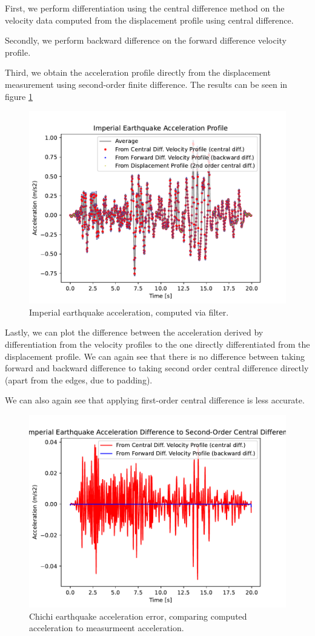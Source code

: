 First, we perform differentiation using the central difference method on the velocity data 
computed from the displacement profile using central difference.

Secondly, we perform backward difference on the forward difference velocity profile.

Third, we obtain the acceleration profile directly from the displacement measurement using second-order 
finite difference. The results can be seen in figure \ref{imperial_acceleration}

\begin{figure}
    \centering
    \includegraphics*[width=0.75\columnwidth]{imperial_acceleration.pdf}
    \caption{Imperial earthquake acceleration, computed via filter.}
    \label{imperial_acceleration}
\end{figure}

\clearpage
Lastly, we can plot the difference between the acceleration derived by differentiation from the velocity 
profiles to the one directly differentiated from the displacement profile. We can again see that there is no 
difference between taking forward and backward difference to taking second order central difference directly 
(apart from the edges, due to padding).

We can also again see that applying first-order central difference is less accurate.


\begin{figure}[h]
    \centering
    \includegraphics*[width=0.75\columnwidth]{imperial_accelertion_diff.pdf}
    \caption{Chichi earthquake acceleration error, comparing computed acceleration to measurmeent acceleration.}
    \label{imperial_acceleration_error}
\end{figure}
\clearpage